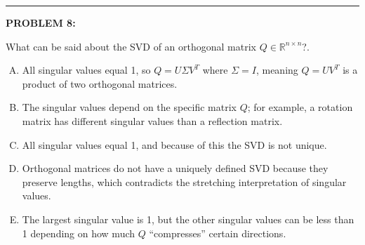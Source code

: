 \documentclass[12pt]{amsart}
\newcommand{\divider}{
  \vspace{-1em} %
  \noindent
  \raisebox{-0.15ex}{\textbullet}%
  \hspace{0.5em}%
  \rule[0.5ex]{0.95\textwidth}{1.0pt}%
  \hspace{0.5em}%
  \raisebox{-0.15ex}{\textbullet}%
  \vspace{0em} %
}
\begin{document}
%
%

\divider

\newpage

{\bf PROBLEM 8:}

What can be said about the SVD of an orthogonal matrix $Q \in \mathbb{R}^{n \times n}$?. 

\begin{enumerate}[(A)]
\item All singular values equal 1, so $Q = U\Sigma V^T$ where $\Sigma = I$, meaning $Q = UV^T$ is a product of two orthogonal matrices.
\item The singular values depend on the specific matrix $Q$; for example, a rotation matrix has different singular values than a reflection matrix.
\item All singular values equal 1, and because of this the SVD is not unique.
\item Orthogonal matrices do not have a uniquely defined SVD because they preserve lengths, which contradicts the stretching interpretation of singular values.
\item The largest singular value is 1, but the other singular values can be less than 1 depending on how much $Q$ ``compresses'' certain directions.
\end{enumerate}
\end{document}
